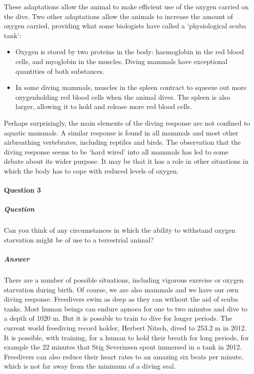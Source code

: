 \documentclass[letterpaper,10pt,english]{sphinxmanual}
\begin{document}
These adaptations allow the animal to make efficient use of the oxygen carried on the dive. Two other adaptations allow the animals to increase the amount of oxygen carried, providing what some biologists have called a ‘physiological scuba tank’:
\begin{itemize}
\item {} 
Oxygen is stored by two proteins in the body: haemoglobin in the red blood cells, and myoglobin in the muscles. Diving mammals have exceptional quantities of both substances.

\item {} 
In some diving mammals, muscles in the spleen contract to squeeze out more oxygen\sphinxhyphen{}holding red blood cells when the animal dives. The spleen is also larger, allowing it to hold and release more red blood cells.

\end{itemize}

Perhaps surprisingly, the main elements of the diving response are not confined to aquatic mammals. A similar response is found in all mammals and most other air\sphinxhyphen{}breathing vertebrates, including reptiles and birds. The observation that the diving response seems to be ‘hard wired’ into all mammals has led to some debate about its wider purpose. It may be that it has a role in other situations in which the body has to cope with reduced levels of oxygen.


\paragraph{Question 3}
\label{\detokenize{content/session_00/Part_00_03:Question-3}}


\subparagraph{Question}
\label{\detokenize{content/session_00/Part_00_03:Question}}
Can you think of any circumstances in which the ability to withstand oxygen starvation might be of use to a terrestrial animal?


\subparagraph{Answer}
\label{\detokenize{content/session_00/Part_00_03:Answer}}
There are a number of possible situations, including vigorous exercise or oxygen starvation during birth. Of course, we are also mammals and we have our own diving response. Freedivers swim as deep as they can without the aid of scuba tanks. Most human beings can endure apnoea for one to two minutes and dive to a depth of 10\textendash{}20 m. But it is possible to train to dive for longer periods. The current world freediving record holder, Herbert Nitsch, dived to 253.2 m in 2012. It is possible, with
training, for a human to hold their breath for long periods, for example the 22 minutes that Stig Severinsen spent immersed in a tank in 2012. Freedivers can also reduce their heart rates to an amazing six beats per minute, which is not far away from the minimum of a diving seal.
\end{document}
